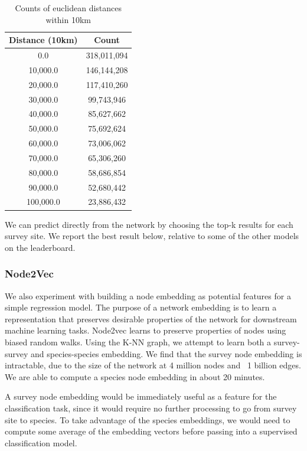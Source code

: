 \begin{table}
    \centering
    \caption{Counts of euclidean distances within 10km}
    \begin{tabular}{|c|c|}
        \hline
        \textbf{Distance (10km)} & \textbf{Count} \\
        \hline
        0.0 & 318,011,094 \\
        10,000.0 & 146,144,208 \\
        20,000.0 & 117,410,260 \\
        30,000.0 & 99,743,946 \\
        40,000.0 & 85,627,662 \\
        50,000.0 & 75,692,624 \\
        60,000.0 & 73,006,062 \\
        70,000.0 & 65,306,260 \\
        80,000.0 & 58,686,854 \\
        90,000.0 & 52,680,442 \\
        100,000.0 & 23,886,432 \\
        \hline
    \end{tabular}
\end{table}

We can predict directly from the network by choosing the top-k results for each survey site. 
We report the best result below, relative to some of the other models on the leaderboard.

\subsubsection{Node2Vec}

We also experiment with building a node embedding as potential features for a simple regression model. 
The purpose of a network embedding is to learn a representation that preserves desirable properties of the network for downstream machine learning tasks. 
Node2vec \cite{grover2016node2vec} learns to preserve properties of nodes using biased random walks. 
Using the K-NN graph, we attempt to learn both a survey-survey and species-species embedding. 
We find that the survey node embedding is intractable, due to the size of the network at 4 million nodes and ~1 billion edges. 
We are able to compute a species node embedding in about 20 minutes.

A survey node embedding would be immediately useful as a feature for the classification task, since it would require no further processing to go from survey site to species. 
To take advantage of the species embeddings, we would need to compute some average of the embedding vectors before passing into a supervised classification model.

